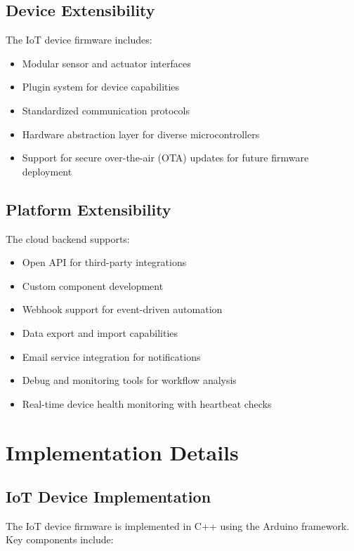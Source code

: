 \documentclass[conference]{IEEEtran}
\begin{document}
\subsection{Device Extensibility}
The IoT device firmware includes:
\begin{itemize}
    \item Modular sensor and actuator interfaces
    \item Plugin system for device capabilities
    \item Standardized communication protocols
    \item Hardware abstraction layer for diverse microcontrollers
    \item Support for secure over-the-air (OTA) updates for future firmware deployment
\end{itemize}

\subsection{Platform Extensibility}
The cloud backend supports:
\begin{itemize}
    \item Open API for third-party integrations
    \item Custom component development
    \item Webhook support for event-driven automation
    \item Data export and import capabilities
    \item Email service integration for notifications
    \item Debug and monitoring tools for workflow analysis
    \item Real-time device health monitoring with heartbeat checks
\end{itemize}

\section{Implementation Details}

\subsection{IoT Device Implementation}
The IoT device firmware is implemented in C++ using the Arduino framework. Key components include:
\end{document}
